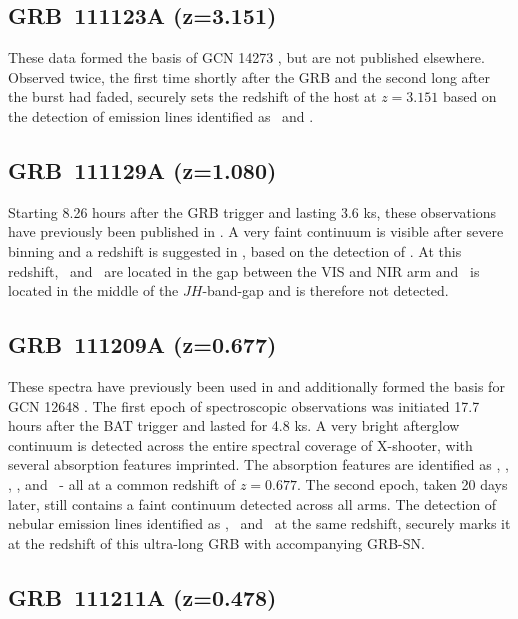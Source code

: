 \documentclass[longauth]{aa}    %
\begin{document}
\subsection{GRB~111123A  (z=3.151)} \label{111123}

These data formed the basis of GCN 14273 \citep{GCN14273}, but are not published
elsewhere. Observed twice, the first time shortly after the GRB and the second
long after the burst had faded, securely sets the redshift of the host at $z =
3.151$ based on the detection of emission lines identified as \oii~and \oiii.

\subsection{GRB~111129A (z=1.080)} \label{111129}

Starting 8.26 hours after the GRB trigger and lasting 3.6 ks, these observations have previously
been published in \citet{Kruhler2015}. A very faint continuum is visible after
severe binning and a redshift is suggested in \citet{Kruhler2015}, based on the
detection of \oii. At this redshift, \hb~and \oii~are located in the gap between
the VIS and NIR arm and \ha~is located in the middle of the $JH$-band-gap and is
therefore not detected.

\subsection{GRB~111209A (z=0.677)} \label{111209}

These spectra have previously been used in \citet{Levan2013, Greiner2015,
	Kruhler2015, Kann2017} and additionally formed the basis for GCN 12648
\citep{GCN12648}. The first epoch of spectroscopic observations was initiated
17.7 hours after the BAT trigger and lasted for 4.8 ks. A very bright
afterglow continuum is detected across the entire spectral coverage of
X-shooter, with several absorption features imprinted. The absorption features
are identified as \feii, \mgii, \mgi, \cah, and \cak~- all at a common redshift
of $z = 0.677$. The second epoch, taken 20 days later, still contains a faint
continuum detected across all arms. The detection of nebular emission lines
identified as \oii, \oii~and \ha~at the same redshift, securely marks it at the
redshift of this ultra-long GRB with accompanying GRB-SN.

\subsection{GRB~111211A (z=0.478)} \label{111211}
\end{document}

